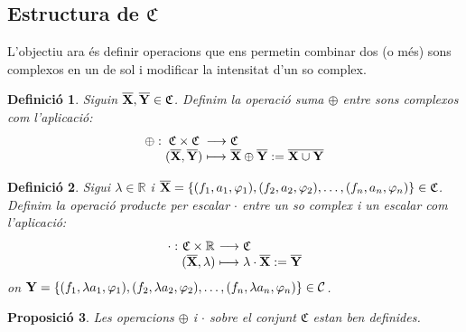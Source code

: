 \documentclass{article}
\theoremstyle{math}
\newtheorem{definition}{Definició}[section]
\newtheorem{prop}[definition]{Proposició}
\newcommand{\0}{\ensuremath{\vb{0}}}
\newcommand{\X}{\ensuremath{\vb{X}}}
\newcommand{\Y}{\ensuremath{\vb{Y}}}
\newcommand{\RR}{\ensuremath{\mathbb{R}}} %
\begin{document}
\subsection{Estructura de \texorpdfstring{$\mathfrak{C}$}{C}}
L'objectiu ara és definir operacions que ens permetin combinar dos (o més) sons complexos en un de sol i modificar la intensitat d'un so complex.
\begin{definition}
    Siguin $\overline{\X},\overline{\Y}\in\mathfrak{C}$. Definim la operació \textit{suma $\oplus$} entre sons complexos com l'aplicació:
    \begin{equation*}
        \begin{array}{r@{\hspace{0.5\tabcolsep}}c@{\hspace{0.5\tabcolsep}}c@{\hspace{0.5\tabcolsep}}l}
            \oplus:&\mathfrak{C}\times\mathfrak{C}&\longrightarrow&\mathfrak{C}\\
            &(\overline{\X},\overline{\Y})&\longmapsto&\overline{\X}\oplus \overline{\Y}:=\overline{\X\cup\Y}
        \end{array}
    \end{equation*}
\end{definition}
\begin{definition}
    Sigui $\lambda\in\RR$ i $\overline{\X}=\{(f_1,a_1,\varphi_1),(f_2,a_2,\varphi_2),\ldots,(f_n,a_n,\varphi_n)\}\in\mathfrak{C}$. Definim la operació \textit{producte per escalar $\cdot$} entre un so complex i un escalar com l'aplicació:
    \begin{equation*}
        \begin{array}{r@{\hspace{0.5\tabcolsep}}c@{\hspace{0.5\tabcolsep}}c@{\hspace{0.5\tabcolsep}}l}
            \cdot:&\mathfrak{C}\times\RR&\longrightarrow&\mathfrak{C}\\
            &(\overline{\X},\lambda)&\longmapsto&\lambda\cdot \overline{\X}:=\overline{\Y}
        \end{array}
    \end{equation*}
    on $\Y=\{(f_1,\lambda a_1,\varphi_1),(f_2,\lambda a_2,\varphi_2),\ldots,(f_n,\lambda a_n,\varphi_n)\}\in\mathcal{C}$.
\end{definition}
\begin{prop}
    Les operacions $\oplus$ i $\cdot$ sobre el conjunt $\mathfrak{C}$ estan ben definides.
\end{prop}
\end{document}
